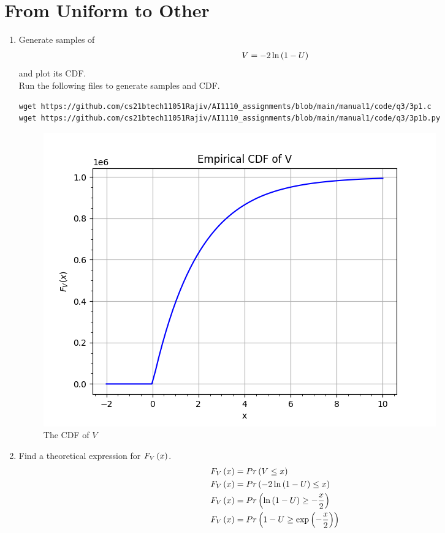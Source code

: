 \documentclass[journal,12pt,twocolumn]{IEEEtran}
\renewcommand\thesection{\arabic{section}}
\begin{document}
\section{From Uniform to Other}
\begin{enumerate}[label=\thesection.\arabic*
,ref=\thesection.\theenumi]
%
\item
Generate samples of 
%
\begin{align}
V = -2\ln\left(1-U\right)
\end{align}
%
and plot its CDF.  
\\
\solution Run the following files to generate samples and CDF.
\begin{lstlisting}
wget https://github.com/cs21btech11051Rajiv/AI1110_assignments/blob/main/manual1/code/q3/3p1.c
wget https://github.com/cs21btech11051Rajiv/AI1110_assignments/blob/main/manual1/code/q3/3p1b.py
\end{lstlisting}
\begin{figure}[ht!]
	\centering
	\includegraphics[width=\columnwidth]{./figs/fig3.1.png}
	\caption{The CDF of $V$}
	\label{fig:misc_cdf}
\end{figure}
\item Find a theoretical expression for $F_V\left(x\right)$.
\\
\solution 
\begin{align}
	F_V\brak{x} &= Pr\brak{V\le x} \\
	F_V\brak{x} &= Pr\brak{-2\ln{\brak{1-U}} \le x}	\\
	F_V\brak{x} &= Pr\brak{\ln{\brak{1-U}} \ge -\frac{x}{2}}	\\
	F_V\brak{x} &= Pr\brak{1-U \ge \exp{\brak{-\frac{x}{2}} }}	\\

\end{align}
\end{enumerate}
\end{document}
